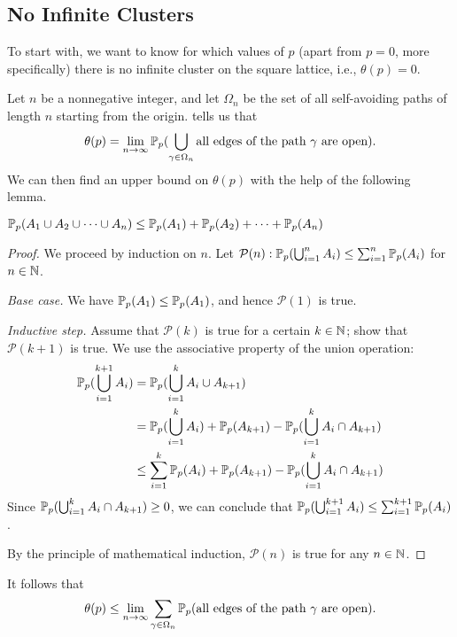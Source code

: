 \documentclass[a4paper, 12pt]{article}
\begin{document}
\subsection{No Infinite Clusters}\label{subsec:no_inf_cluster}
To start with, we want to know for which values of $p$ (apart from $p = 0$, more specifically) there is no infinite cluster on the square lattice, i.e., $\theta(p) = 0$.

Let $n$ be a nonnegative integer, and let $\Omega_n$ be the set of all self-avoiding paths of length $n$ starting from the origin.  tells us that
\[\theta(p) = \lim_{n \to \infty} \P(\bigcup_{\gamma \in \Omega_n} \text{all edges of the path } \gamma \text{ are open}).\]
We can then find an upper bound on $\theta(p)$ with the help of the following lemma.

\begin{lem}\label{lem:union_bound}
$\P(A_1 \cup A_2 \cup \cdots \cup A_n) \leq \P(A_1) + \P(A_2) + \cdots + \P(A_n)$
\end{lem}
\begin{proof}[Proof]
We proceed by induction on $n$. Let $\mathcal{P}(n): \P(\bigcup_{i = 1}^n A_i) \leq \sum_{i = 1}^n \P(A_i)$ for  $n \in \N$.
\begin{description}
\item \textit{Base case.} We have $\P(A_1) \leq \P(A_1)$, and hence $\mathcal{P}(1)$ is true.
\item \textit{Inductive step.} Assume that $\mathcal{P}(k)$ is true for a certain $k \in \N$; show that $\mathcal{P}(k + 1)$ is true.
We use the associative property of the union operation:
\begin{align*}
    \P(\bigcup_{i = 1}^{k + 1} A_i) 
    &= \P(\bigcup_{i = 1}^{k} A_i \cup A_{k + 1})\\
    &= \P(\bigcup_{i = 1}^{k} A_i) + \P(A_{k + 1}) - \P(\bigcup_{i = 1}^{k} A_i \cap A_{k + 1})\\
    &\leq \sum_{i = 1}^k \P(A_i) + \P(A_{k + 1}) - \P(\bigcup_{i = 1}^{k} A_i \cap A_{k + 1})\\
\end{align*}
Since $\P(\bigcup_{i = 1}^{k} A_i \cap A_{k + 1}) \geq 0$, we can conclude that $\P(\bigcup_{i = 1}^{k + 1} A_i) \leq \sum_{i = 1}^{k + 1} \P(A_i)$.
\end{description}
By the principle of mathematical induction, $\mathcal{P}(n)$ is true for any $n \in \N$.
\end{proof}

It follows that
\[\theta(p) \leq \lim_{n \to \infty} \sum_{\gamma \in \Omega_n} \P(\text{all edges of the path } \gamma \text{ are open}).\]
\end{document}
